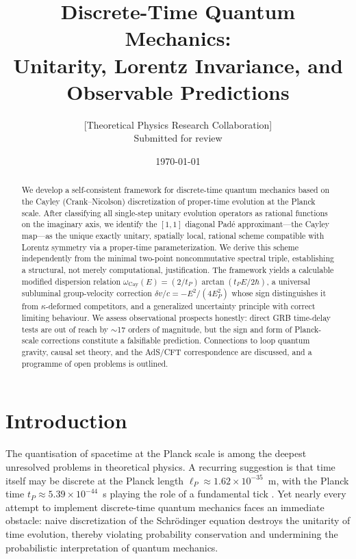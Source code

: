 \documentclass[12pt,a4paper]{article}
\title{\textbf{Discrete-Time Quantum Mechanics:\\
Unitarity, Lorentz Invariance, and Observable Predictions}}
\author{%
  [Theoretical Physics Research Collaboration]\\[4pt]
  \small Submitted for review
}
\date{\today}
\begin{document}
\maketitle

\begin{abstract}
We develop a self-consistent framework for discrete-time quantum mechanics based on the
Cayley (Crank--Nicolson) discretization of proper-time evolution at the Planck scale.
After classifying all single-step unitary evolution operators as rational functions on the
imaginary axis, we identify the $[1,1]$ diagonal Pad\'e approximant---the Cayley map---as
the unique exactly unitary, spatially local, rational scheme compatible with Lorentz
symmetry via a proper-time parameterization. We derive this scheme independently from the
minimal two-point noncommutative spectral triple, establishing a structural, not merely
computational, justification. The framework yields a calculable modified dispersion
relation $\omega_{\mathrm{Cay}}(E) = (2/t_P)\arctan(t_P E/2\hbar)$, a universal
subluminal group-velocity correction $\delta v/c = -E^2/(4E_P^2)$ whose sign
distinguishes it from $\kappa$-deformed competitors, and a generalized uncertainty
principle with correct limiting behaviour. We assess observational prospects honestly:
direct GRB time-delay tests are out of reach by $\sim$17 orders of magnitude, but the
sign and form of Planck-scale corrections constitute a falsifiable prediction. Connections
to loop quantum gravity, causal set theory, and the AdS/CFT correspondence are discussed,
and a programme of open problems is outlined.
\end{abstract}

\tableofcontents
\newpage

\section{Introduction}
\label{sec:introduction}

The quantisation of spacetime at the Planck scale is among the deepest unresolved problems
in theoretical physics. A recurring suggestion is that time itself may be discrete at the
Planck length $\ell_P \approx 1.62 \times 10^{-35}$~m, with the Planck time
$t_P \approx 5.39 \times 10^{-44}$~s playing the role of a fundamental tick
\cite{ashtekar2004,henson2006,thiemann1996}. Yet nearly every attempt to implement
discrete-time quantum mechanics faces an immediate obstacle: naive discretization of the
Schr\"odinger equation destroys the unitarity of time evolution, thereby violating
probability conservation and undermining the probabilistic interpretation of quantum
mechanics.
\end{document}
